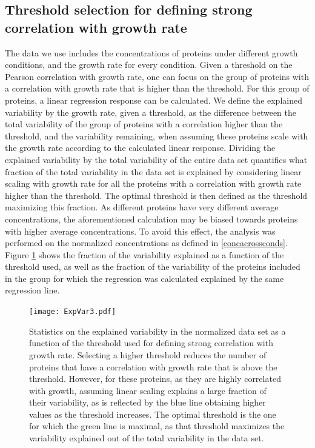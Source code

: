 \documentclass[notitlepage]{article}
\begin{document}
\subsection{Threshold selection for defining strong correlation with growth rate}
\label{corrthreshold}
The data we use includes the concentrations of proteins under different growth conditions, and the growth rate for every condition.
Given a threshold on the Pearson correlation with growth rate, one can focus on the group of proteins with a correlation with growth rate that is higher than the threshold.
For this group of proteins, a linear regression response can be calculated.
We define the explained variability by the growth rate, given a threshold, as the difference between the total variability of the group of proteins with a correlation higher than the threshold, and the variability remaining, when assuming these proteins scale with the growth rate according to the calculated linear response.
Dividing the explained variability by the total variability of the entire data set quantifies what fraction of the total variability in the data set is explained by considering linear scaling with growth rate for all the proteins with a correlation with growth rate higher than the threshold.
The optimal threshold is then defined as the threshold maximizing this fraction.
As different proteins have very different average concentrations, the aforementioned calculation may be biased towards proteins with higher average concentrations.
To avoid this effect, the analysis was performed on the normalized concentrations as defined in \ref{concacrossconds}.
Figure \ref{fig:threshold} shows the fraction of the variability explained as a function of the threshold used, as well as the fraction of the variability of the proteins included in the group for which the regression was calculated explained by the same regression line.
\begin{figure}[h]
\centering
\texttt{[image: ExpVar3.pdf]}
\caption{
  Statistics on the explained variability in the normalized data set as a function of the threshold used for defining strong correlation with growth rate.
  Selecting a higher threshold reduces the number of proteins that have a correlation with growth rate that is above the threshold.
  However, for these proteins, as they are highly correlated with growth, assuming linear scaling explains a large fraction of their variability, as is reflected by the blue line obtaining higher values as the threshold increases.
  The optimal threshold is the one for which the green line is maximal, as that threshold maximizes the variability explained out of the total variability in the data set.
}
\label{fig:threshold}
\end{figure}
\end{document}
